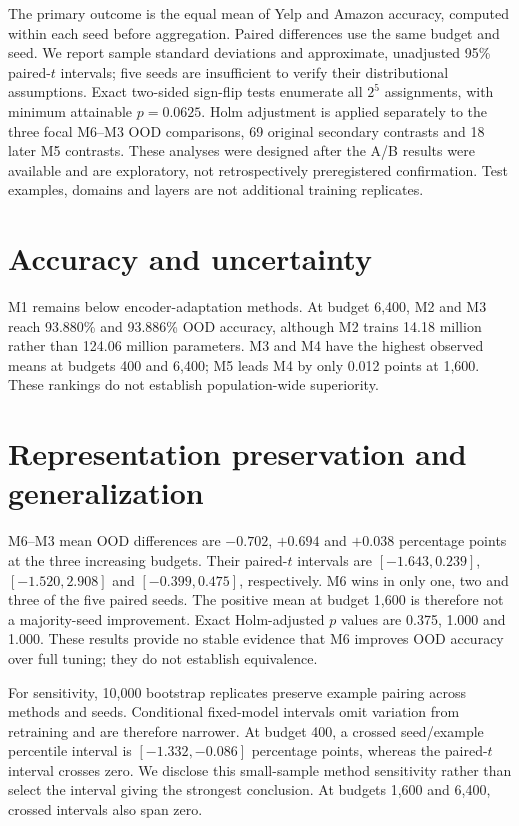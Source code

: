 \documentclass[a4paper,10pt]{article}
\begin{document}
The primary outcome is the equal mean of Yelp and Amazon accuracy, computed within each seed before aggregation. Paired differences use the same budget and seed. We report sample standard deviations and approximate, unadjusted 95\% paired-$t$ intervals; five seeds are insufficient to verify their distributional assumptions. Exact two-sided sign-flip tests enumerate all $2^5$ assignments, with minimum attainable $p=0.0625$. Holm adjustment is applied separately to the three focal M6--M3 OOD comparisons, 69 original secondary contrasts and 18 later M5 contrasts. These analyses were designed after the A/B results were available and are exploratory, not retrospectively preregistered confirmation. Test examples, domains and layers are not additional training replicates.

\section{Accuracy and uncertainty}
\begin{center}

\end{center}
M1 remains below encoder-adaptation methods. At budget 6,400, M2 and M3 reach 93.880\% and 93.886\% OOD accuracy, although M2 trains 14.18 million rather than 124.06 million parameters. M3 and M4 have the highest observed means at budgets 400 and 6,400; M5 leads M4 by only 0.012 points at 1,600. These rankings do not establish population-wide superiority.

\clearpage
\section{Representation preservation and generalization}
M6--M3 mean OOD differences are $-0.702$, $+0.694$ and $+0.038$ percentage points at the three increasing budgets. Their paired-$t$ intervals are $[-1.643,0.239]$, $[-1.520,2.908]$ and $[-0.399,0.475]$, respectively. M6 wins in only one, two and three of the five paired seeds. The positive mean at budget 1,600 is therefore not a majority-seed improvement. Exact Holm-adjusted $p$ values are 0.375, 1.000 and 1.000. These results provide no stable evidence that M6 improves OOD accuracy over full tuning; they do not establish equivalence.

For sensitivity, 10,000 bootstrap replicates preserve example pairing across methods and seeds. Conditional fixed-model intervals omit variation from retraining and are therefore narrower. At budget 400, a crossed seed/example percentile interval is $[-1.332,-0.086]$ percentage points, whereas the paired-$t$ interval crosses zero. We disclose this small-sample method sensitivity rather than select the interval giving the strongest conclusion. At budgets 1,600 and 6,400, crossed intervals also span zero.
\end{document}
